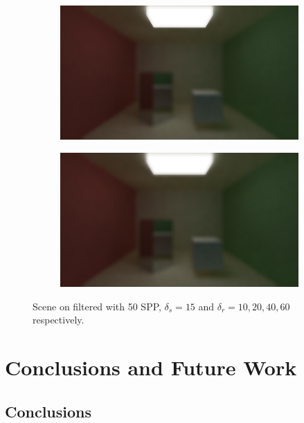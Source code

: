 \documentclass[titlepage,12pt]{report}
\begin{document}
\begin{figure}[H]
	\begin{subfigure}{.48\textwidth}
		\centering
		\includegraphics[scale=0.2]{media/bilateral/cornell_normal_50_bilateral_filter_21_15_40.png}
		\label{bilateral_filter_23}
	\end{subfigure}
	\begin{subfigure}{.48\textwidth}
		\centering
		\includegraphics[scale=0.2]{media/bilateral/cornell_normal_50_bilateral_filter_21_15_60.png}
		\label{bilateral_filter_24}
	\end{subfigure}
	\caption{Scene on filtered with 50 SPP, $\delta_s = 15$ and $\delta_r = 10, 20, 40, 60$ respectively.}
	\label{bilateral_filter_06}
\end{figure}

\chapter{Conclusions and Future Work}

\section{Conclusions}
\end{document}
